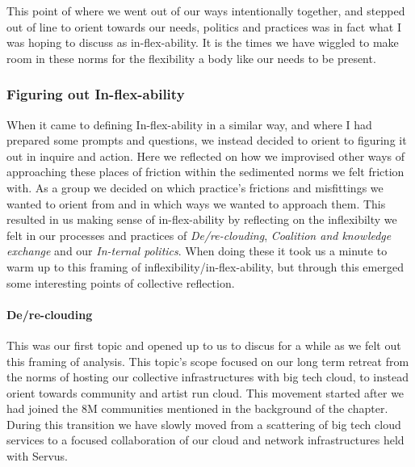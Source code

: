 This point of where we went out of our ways intentionally together, and
stepped out of line to orient towards our needs, politics and practices
was in fact what I was hoping to discuss as in-flex-ability. It is the
times we have wiggled to make room in these norms for the flexibility a
body like our needs to be present.

\hypertarget{figuring-out-in-flex-ability}{%
\subsubsection[Figuring out
In-flex-ability]{\texorpdfstring{\protect\hypertarget{anchor}{}{}Figuring
out
In-flex-ability}{Figuring out In-flex-ability}}\label{figuring-out-in-flex-ability}}

When it came to defining In-flex-ability in a similar way, and where I
had prepared some prompts and questions, we instead decided to orient to
figuring it out in inquire and action. Here we reflected on how we
improvised other ways of approaching these places of friction within the
sedimented norms we felt friction with. As a group we decided on which
practice's frictions and misfittings we wanted to orient from and in
which ways we wanted to approach them. This resulted in us making sense
of in-flex-ability by reflecting on the inflexibilty we felt in our
processes and practices of \emph{De/re-clouding}, \emph{Coalition and
knowledge exchange} and our \emph{In-ternal politics}. When doing these
it took us a minute to warm up to this framing of
inflexibility/in-flex-ability, but through this emerged some interesting
points of collective reflection.

\hypertarget{dere-clouding}{%
\paragraph[De/re-clouding]{\texorpdfstring{\protect\hypertarget{anchor}{}{}De/re-clouding}{De/re-clouding}}\label{dere-clouding}}

This was our first topic and opened up to us to discus for a while as we
felt out this framing of analysis. This topic's scope focused on our
long term retreat from the norms of hosting our collective
infrastructures with big tech cloud, to instead orient towards community
and artist run cloud. This movement started after we had joined the 8M
communities mentioned in the background of the chapter. During this
transition we have slowly moved from a scattering of big tech cloud
services to a focused collaboration of our cloud and network
infrastructures held with Servus.

